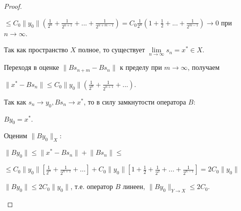 \documentclass[12pt,a4paper,titlepage,oneside]{book}
\theoremstyle{definition}
\theoremstyle{plain}
\theoremstyle{remark}
\theoremstyle{remark}
\theoremstyle{remark}
\theoremstyle{remark}
\theoremstyle{plain}
\theoremstyle{plain}
\begin{document}
\begin{proof}
\begin{enumerate}
\begin{center}
$\leq C_0 \lVert y_0 \rVert (\frac{1}{2^n} + \frac{1}{2^{n+1}}+...+\frac{1}{2^{n+m-1}})=C_0 \frac{1}{2^n} (1 + \frac{1}{2}+...+\frac{1}{2^{m-1}}) \to 0$ при $n \to \infty$.
\end{center}

Так как пространство $X$ полное, то существует $\lim \limits_{n \to \infty} s_n=x^* \in X$.

Переходя в оценке $ \lVert B s_{n+m}-B s_n \rVert$ к пределу при $m \to \infty$, получаем

\begin{center}
$ \lVert x^*-B s_n \rVert \leq C_0 \lVert y_0\rVert (\frac{1}{2^n} + \frac{1}{2^{n+1}}+...)$.
\end{center}

Так как $s_n \to y_0, B s_n \to x^*$, то в силу замкнутости оператора $B$: 

\begin{center}
$B y_0=x^* $.
\end{center}

Оценим $\lVert B y_0 \rVert _X$:

\begin{center}
$\lVert B y_0 \rVert \leq \lVert x^* - B s_n \rVert + \lVert B s_n \rVert \leq$ 
\end{center}

\begin{center}
$\leq C_0 \lVert y_0\rVert [\frac{1}{2^n} + \frac{1}{2^{n+1}}+...] + C_0 \lVert y_0\rVert [1+\frac{1}{2} +\frac{1}{2^2}+ ...+\frac{1}{2^{n-1}}]= 2 C_0 \lVert y_0\rVert$
\end{center}

$\lVert B y_0 \rVert \leq 2 C_0 \lVert y_0\rVert$, т.е. оператор $B$ линеен, $ \lVert B y_0 \rVert _{Y \to X} \leq 2 C_0$.

\end{enumerate}

\end{proof}
\end{document}
